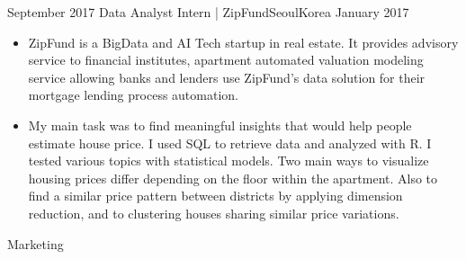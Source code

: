 \begin{experiences}
  
 \experience
    {September 2017} {Data Analyst Intern | ZipFund}{Seoul}{Korea}
    {January 2017}    {\begin{itemize}
               \item ZipFund is a BigData and AI Tech startup in real estate. It provides advisory service to financial institutes, apartment automated valuation modeling service allowing banks and lenders use ZipFund's data solution for their mortgage lending process automation.

               \item  My main task was to find meaningful insights that would help people estimate house price. I used SQL to retrieve data and analyzed with R. I tested various topics with statistical models. Two main ways to visualize housing prices differ depending on the floor within the apartment. Also to find a similar price pattern between districts by applying dimension reduction, and to clustering houses sharing similar price variations. 
               \end{itemize}}
            {Marketing}
  \emptySeparator
  
  
  
  
\end{experiences}
